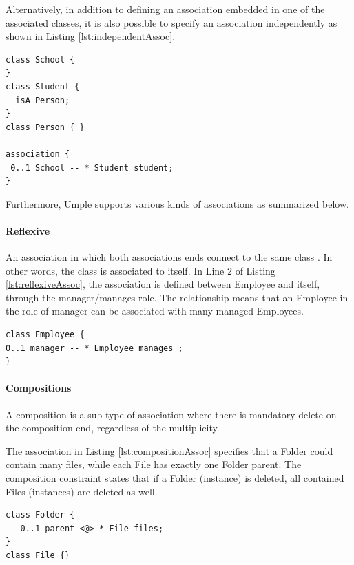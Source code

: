 Alternatively, in addition to defining an association embedded in one of the associated classes, it is also possible to specify an association independently as shown in Listing \ref{lst:independentAssoc}. 

\begin{lstlisting}[style=umplePlain, caption=An example of an independent Umple Association,label=lst:independentAssoc]
class School {
}
class Student {
  isA Person;
}
class Person { }

association {
 0..1 School -- * Student student;
}
\end{lstlisting}
Furthermore, Umple supports various kinds of associations as summarized below.
\paragraph{Reflexive}
An association in which both associations ends connect to the same class \cite{UMLSpec}. In other words, the class is associated to itself. In Line 2 of Listing \ref{lst:reflexiveAssoc}, the association is defined between Employee and itself, through the manager/manages role. The relationship means that an Employee in the role of manager can be associated with many managed Employees. 

\begin{lstlisting}[style=umplePlainNumbers, caption=A Reflexive association,label=lst:reflexiveAssoc]
class Employee {
0..1 manager -- * Employee manages ;
}
\end{lstlisting}

\paragraph{Compositions}
A composition \cite{UMLSpec} is a sub-type of association where there is mandatory delete on the composition end, regardless of the multiplicity. 

The association in Listing \ref{lst:compositionAssoc} specifies that a Folder could contain many files, while each File has exactly one Folder parent. The composition constraint states that if a Folder (instance) is deleted, all contained Files (instances) are deleted as well.
\begin{lstlisting}[style=umplePlainNumbers, caption=A Composite association,label=lst:compositionAssoc]
class Folder { 
   0..1 parent <@>-* File files;
}
class File {}
\end{lstlisting}

